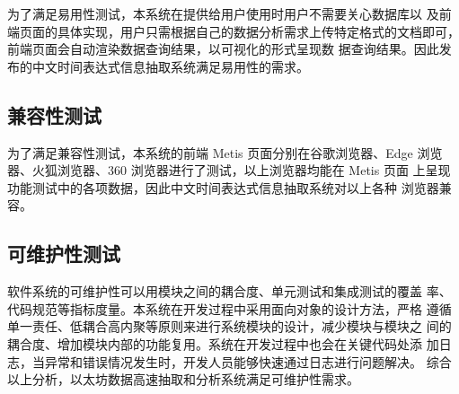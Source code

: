 为了满足易用性测试，本系统在提供给用户使用时用户不需要关心数据库以
及前端页面的具体实现，用户只需根据自己的数据分析需求上传特定格式的文档即可，前端页面会自动渲染数据查询结果，以可视化的形式呈现数
据查询结果。因此发布的中文时间表达式信息抽取系统满足易用性的需求。

\subsection{兼容性测试}

为了满足兼容性测试，本系统的前端 Metis 页面分别在谷歌浏览器、Edge
浏览器、火狐浏览器、360 浏览器进行了测试，以上浏览器均能在 Metis 页面
上呈现功能测试中的各项数据，因此中文时间表达式信息抽取系统对以上各种
浏览器兼容。

\subsection{可维护性测试}

软件系统的可维护性可以用模块之间的耦合度、单元测试和集成测试的覆盖
率、代码规范等指标度量。本系统在开发过程中采用面向对象的设计方法，严格
遵循单一责任、低耦合高内聚等原则来进行系统模块的设计，减少模块与模块之
间的耦合度、增加模块内部的功能复用。系统在开发过程中也会在关键代码处添
加日志，当异常和错误情况发生时，开发人员能够快速通过日志进行问题解决。
综合以上分析，以太坊数据高速抽取和分析系统满足可维护性需求。

